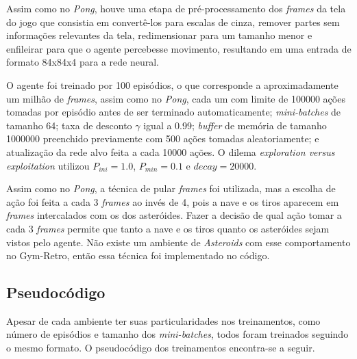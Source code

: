 Assim como no \textit{Pong}, houve uma etapa de pré-processamento dos \textit{frames} da tela do jogo que consistia em convertê-los para escalas de cinza, remover partes sem informações relevantes da tela, redimensionar para um tamanho menor e enfileirar para que o agente percebesse movimento, resultando em uma entrada de formato 84x84x4 para a rede neural.

O agente foi treinado por 100 episódios, o que corresponde a aproximadamente um milhão de \textit{frames}, assim como no \textit{Pong}, cada um com limite de 100000 ações tomadas por episódio antes de ser terminado automaticamente;
\textit{mini-batches} de tamanho 64;
taxa de desconto $\gamma$ igual a 0.99;
\textit{buffer} de memória de tamanho 1000000 preenchido previamente com 500 ações tomadas aleatoriamente;
e atualização da rede alvo feita a cada 10000 ações.
O dilema \textit{exploration versus exploitation} utilizou $P_{ini} = 1.0$, $P_{min} = 0.1$ e $decay = 20000$.

Assim como no \textit{Pong}, a técnica de pular \textit{frames} foi utilizada, mas a escolha de ação foi feita a cada 3 \textit{frames} ao invés de 4, pois a nave e os tiros aparecem em \textit{frames} intercalados com os dos asteróides.
Fazer a decisão de qual ação tomar a cada 3 \textit{frames} permite que tanto a nave e os tiros quanto os asteróides sejam vistos pelo agente.
Não existe um ambiente de \textit{Asteroids} com esse comportamento no Gym-Retro, então essa técnica foi implementado no código.


\subsection{Pseudocódigo}
\label{sec:pseudocodigo}

Apesar de cada ambiente ter suas particularidades nos treinamentos, como número de episódios e tamanho dos \textit{mini-batches}, todos foram treinados seguindo o mesmo formato.
O pseudocódigo dos treinamentos encontra-se a seguir.

